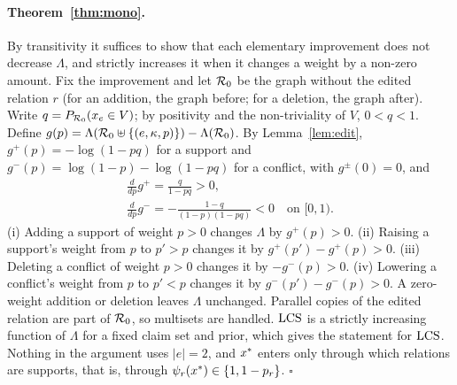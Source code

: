 \paragraph{Theorem~\ref{thm:mono}.} By transitivity it suffices to show that each elementary
improvement does not decrease $\Lambda$, and strictly increases it when it changes a weight by a
non-zero amount. Fix the improvement and let $\mathcal{R}_0$ be the graph without the edited relation $r$
(for an addition, the graph before; for a deletion, the graph after). Write
$q=P_{\mathcal{R}_0}(x_e\in V)$; by positivity and the non-triviality of $V$, $0<q<1$. Define
$g(p)=\Lambda(\mathcal{R}_0\uplus\{(e,\kappa,p)\})-\Lambda(\mathcal{R}_0)$. By Lemma~\ref{lem:edit},
$g^+(p)=-\log(1-pq)$ for a support and $g^-(p)=\log(1-p)-\log(1-pq)$ for a conflict, with
$g^\pm(0)=0$, and
\begin{gather*}
\tfrac{d}{dp}g^+=\tfrac{q}{1-pq}>0,\\
\tfrac{d}{dp}g^-=-\tfrac{1-q}{(1-p)(1-pq)}<0\quad\text{on }[0,1).
\end{gather*}
(i) Adding a support of weight $p>0$ changes $\Lambda$ by $g^+(p)>0$. (ii) Raising a support's
weight from $p$ to $p'>p$ changes it by $g^+(p')-g^+(p)>0$. (iii) Deleting a conflict of weight
$p>0$ changes it by $-g^-(p)>0$. (iv) Lowering a conflict's weight from $p$ to $p'<p$ changes it
by $g^-(p')-g^-(p)>0$. A zero-weight addition or deletion leaves $\Lambda$ unchanged. Parallel
copies of the edited relation are part of $\mathcal{R}_0$, so multisets are handled. $\mathrm{LCS}$ is a strictly
increasing function of $\Lambda$ for a fixed claim set and prior, which gives the statement for
$\mathrm{LCS}$. Nothing in the argument uses $|e|=2$, and $x^{\ast}$
enters only through which relations are supports, that is, through $\psi_r(x^{\ast})\in\{1,1-p_r\}$.
$\square$

